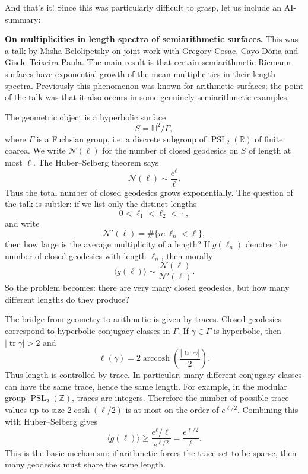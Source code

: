 \noindent
And that's it! Since this was particularly
difficult to grasp, let us
include an AI-summary:

\medskip\noindent
{\bf On multiplicities in length spectra of
semiarithmetic surfaces.}
This was a talk by Misha Belolipetsky on
joint work with Gregory Cosac, Cayo Dória
and Gisele Teixeira Paula. The main result
is that certain semiarithmetic Riemann
surfaces have exponential growth of the
mean multiplicities in their length spectra.
Previously this phenomenon was known for
arithmetic surfaces; the point of the talk
was that it also occurs in some genuinely
semiarithmetic examples.

\medskip\noindent
The geometric object is a hyperbolic surface
$$
S=\mathbb{H}^2/\Gamma,
$$
where $\Gamma$ is a Fuchsian group, i.e. a
discrete subgroup of
$\operatorname{PSL}_2(\mathbb{R})$ of finite
coarea. We write $\mathcal{N}(\ell)$ for the
number of closed geodesics on $S$ of length
at most $\ell$. The Huber--Selberg theorem
says
$$
\mathcal{N}(\ell)\sim \frac{e^\ell}{\ell}.
$$
Thus the total number of closed geodesics
grows exponentially. The question of the talk
is subtler: if we list only the distinct
lengths
$$
0<\ell_1<\ell_2<\cdots,
$$
and write
$$
\mathcal{N}'(\ell)=\#\{n:\ell_n<\ell\},
$$
then how large is the average multiplicity
of a length? If $g(\ell_n)$ denotes the
number of closed geodesics with length
$\ell_n$, then morally
$$
\langle g(\ell)\rangle
\sim
\frac{\mathcal{N}(\ell)}{\mathcal{N}'(\ell)}.
$$
So the problem becomes: there are very many
closed geodesics, but how many different
lengths do they produce?

\medskip\noindent
The bridge from geometry to arithmetic is
given by traces. Closed geodesics correspond
to hyperbolic conjugacy classes in
$\Gamma$. If $\gamma\in\Gamma$ is
hyperbolic, then $|\operatorname{tr}\gamma|>2$
and
$$
\ell(\gamma)
=
2\operatorname{arccosh}
\left(\frac{|\operatorname{tr}\gamma|}{2}\right).
$$
Thus length is controlled by trace. In
particular, many different conjugacy classes
can have the same trace, hence the same
length. For example, in the modular group
$\operatorname{PSL}_2(\mathbb{Z})$, traces
are integers. Therefore the number of
possible trace values up to size
$2\cosh(\ell/2)$ is at most on the order of
$e^{\ell/2}$. Combining this with
Huber--Selberg gives
$$
\langle g(\ell)\rangle
\geq
\frac{e^\ell/\ell}{e^{\ell/2}}
=
\frac{e^{\ell/2}}{\ell}.
$$
This is the basic mechanism: if arithmetic
forces the trace set to be sparse, then many
geodesics must share the same length.

